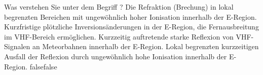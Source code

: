     {Was verstehen Sie unter dem Begriff ?}
    {Die Refraktion (Brechung) in lokal begrenzten Bereichen mit ungewöhnlich hoher Ionisation innerhalb der E-Region.}
    {Kurzfristige plötzliche Inversionsänderungen in der E-Region, die Fernausbreitung im VHF-Bereich ermöglichen.}
    {Kurzzeitig auftretende starke Reflexion von VHF-Signalen an Meteorbahnen innerhalb der E-Region.}
    {Lokal begrenzten kurzzeitigen Ausfall der Reflexion durch ungewöhnlich hohe Ionisation innerhalb der E-Region.}
    {false}{false}